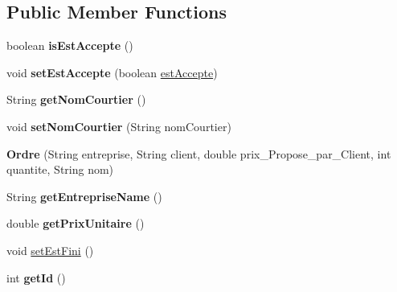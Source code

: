 \subsection*{Public Member Functions}
\begin{DoxyCompactItemize}
\item 
\mbox{\label{classcom_1_1m1sar_1_1_ordre_a40d50192a295fa377b1955067e3b8455}} 
boolean {\bfseries is\+Est\+Accepte} ()
\item 
\mbox{\label{classcom_1_1m1sar_1_1_ordre_a42b1cc0fb374898ee7feb5335db1541d}} 
void {\bfseries set\+Est\+Accepte} (boolean \hyperlink{classcom_1_1m1sar_1_1_ordre_a7022809430ff96ce182601f7885d853c}{est\+Accepte})
\item 
\mbox{\label{classcom_1_1m1sar_1_1_ordre_ac73cb37536a9b72f8b0dcb2504e5da2b}} 
String {\bfseries get\+Nom\+Courtier} ()
\item 
\mbox{\label{classcom_1_1m1sar_1_1_ordre_a67efcf96141aa33f891303e56a4e1996}} 
void {\bfseries set\+Nom\+Courtier} (String nom\+Courtier)
\item 
\mbox{\label{classcom_1_1m1sar_1_1_ordre_a891dc1109048dd71c732b942d6fb82ea}} 
{\bfseries Ordre} (String entreprise, String client, double prix\+\_\+\+Propose\+\_\+par\+\_\+\+Client, int quantite, String nom)
\item 
\mbox{\label{classcom_1_1m1sar_1_1_ordre_a9528377ac85a5743487fc5cd799a2dce}} 
String {\bfseries get\+Entreprise\+Name} ()
\item 
\mbox{\label{classcom_1_1m1sar_1_1_ordre_ad7f04c3a54d48f2d49f5b9a92861072d}} 
double {\bfseries get\+Prix\+Unitaire} ()
\item 
void \hyperlink{classcom_1_1m1sar_1_1_ordre_aabc1a386ae20e7aa15391de8c2ab0062}{set\+Est\+Fini} ()
\item 
\mbox{\label{classcom_1_1m1sar_1_1_ordre_aaa2f967373a08a112418e8056fd31f2e}} 
int {\bfseries get\+Id} ()
\item 
\mbox{\label{classcom_1_1m1sar_1_1_ordre_ab6c7bc3c700bd50cb0e27f101b3faae2}} 

\end{DoxyCompactItemize}
